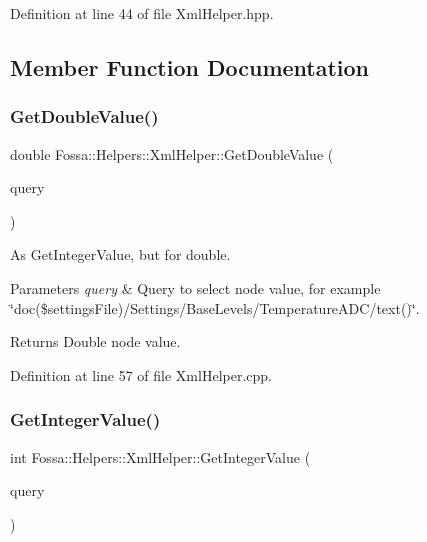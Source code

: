 Definition at line 44 of file Xml\+Helper.\+hpp.



\subsection{Member Function Documentation}
\mbox{\label{class_fossa_1_1_helpers_1_1_xml_helper_aa079061f79b80c958c5f21c3e0b02252}} 
\subsubsection{\texorpdfstring{Get\+Double\+Value()}{GetDoubleValue()}}
{\footnotesize\ttfamily double Fossa\+::\+Helpers\+::\+Xml\+Helper\+::\+Get\+Double\+Value (\begin{DoxyParamCaption}\item[{const Q\+Xml\+Query $\ast$}]{query }\end{DoxyParamCaption})\hspace{0.3cm}{\ttfamily [static]}}



As Get\+Integer\+Value, but for double. 


\begin{DoxyParams}{Parameters}
{\em query} & Query to select node value, for example \char`\"{}doc(\$settings\+File)/\+Settings/\+Base\+Levels/\+Temperature\+A\+D\+C/text()\char`\"{}. \\
\hline
\end{DoxyParams}
\begin{DoxyReturn}{Returns}
Double node value. 
\end{DoxyReturn}


Definition at line 57 of file Xml\+Helper.\+cpp.

\mbox{\label{class_fossa_1_1_helpers_1_1_xml_helper_a7bc8a5dd4d5ab503f274c3bb9a559f84}} 
\subsubsection{\texorpdfstring{Get\+Integer\+Value()}{GetIntegerValue()}}
{\footnotesize\ttfamily int Fossa\+::\+Helpers\+::\+Xml\+Helper\+::\+Get\+Integer\+Value (\begin{DoxyParamCaption}\item[{const Q\+Xml\+Query $\ast$}]{query }\end{DoxyParamCaption})\hspace{0.3cm}{\ttfamily [static]}}



